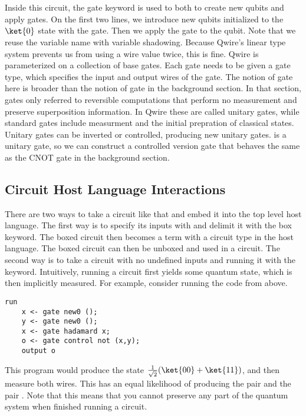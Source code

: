 \\
\\
Inside this circuit, the gate keyword is used to both to create new qubits and apply gates.
On the first two lines, we introduce new qubits initialized to the $\ket{0}$ state with the  gate.
Then we apply the  gate to the  qubit.
Note that we reuse the variable name  with variable shadowing.
Because Qwire's linear type system prevents us from using a wire value twice, this is fine.
Qwire is parameterized on a collection of base gates. 
Each gate needs to be given a gate type, which specifies the input and output wires of the gate. 
The notion of gate here is broader than the notion of gate in the background section. 
In that section, gates only referred to reversible computations that perform no measurement and preserve superposition information. 
In Qwire these are called unitary gates, while standard gates include measurment and the initial prepration of classical states. 
Unitary gates can be inverted or controlled, producing new unitary gates.
 is a unitary gate, so we can construct a controlled version  gate that behaves the same as the CNOT gate in the background section.

\subsection{Circuit Host Language Interactions}

There are two ways to take a circuit like that and embed it into the top level host language.
The first way is to specify its inputs with and delimit it with the box keyword.
The boxed circuit then becomes a term with a circuit type in the host language.
The boxed circuit can then be unboxed and used in a circuit.
The second way is to take a circuit with no undefined inputs and running it with the \run keyword.
Intuitively, running a circuit first yields some quantum state, which is then implicitly measured.
For example, consider running the code from above.
\begin{lstlisting}[style=customcoq]
run
    x <- gate new0 ();
    y <- gate new0 ();
    x <- gate hadamard x;
    o <- gate control not (x,y);
    output o
\end{lstlisting}
This program would produce the state $\frac{1}{\sqrt{2}}(\ket{00} + \ket{11})$, and then measure both wires.
This has an equal likelihood of producing the pair  and the pair .
Note that this means that you cannot preserve any part of the quantum system when finished running a circuit.

